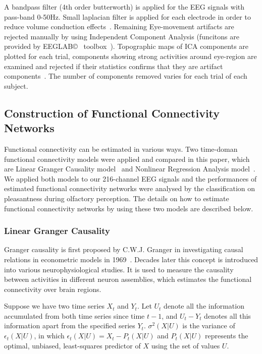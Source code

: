 A bandpass filter (4th order butterworth) is applied for the EEG signals with pass-band 0-50Hz. Small laplacian filter is applied for each electrode in order to reduce volume conduction effects~\cite{wolters2007volume}. Remaining Eye-movement artifacts are rejected manually by using Independent Component Analysis (funcitons are provided by EEGLAB\copyright~ toolbox~\cite{luck2014introduction}). Topographic maps of ICA components are plotted for each trial, components showing strong activities around eye-region are examined and rejected if their statistics confirms that they are artifact components~\cite{luck2014introduction}. The number of components removed varies for each trial of each subject. 

\subsection{Construction of Functional Connectivity Networks}
Functional connectivity can be estimated in various ways. Two time-doman functional connectivity models were applied and compared in this paper, which are Linear Granger Causality model~\cite{roebroeck2005mapping}  and Nonlinear Regression Analysis model~\cite{bettus2008enhanced}. We applied both models to our 216-channel EEG signals and the performances of estimated functional connectivity networks were analysed by the classification on pleasantness during olfactory perception. The details on how to estimate functional connectivity networks by using these two models are described below.

\subsubsection{Linear Granger Causality}
Granger causality is first proposed by C.W.J. Granger in investigating causal relations in econometric models in 1969~\cite{granger1969investigating}. Decades later this concept is introduced into various neurophysiological studies. It is used to measure the causality between activities in different neuron assemblies, which estimates the functional connectivity over brain regions. 

Suppose we have two time series $X_t$ and $Y_t$. Let $U_t$ denote all the information accumulated from both time series since time $t-1$, and $U_t-Y_t$ denotes all this information apart from the specified series $Y_t$. $\sigma^2(X|U)$ is the variance of $\epsilon_t(X|U)$, in which $\epsilon_t(X|U)=X_t-P_t(X|U)$ and $P_t(X|U)$ represents the optimal, unbiased, least-squares predictor of $X$ using the set of values $U$.

